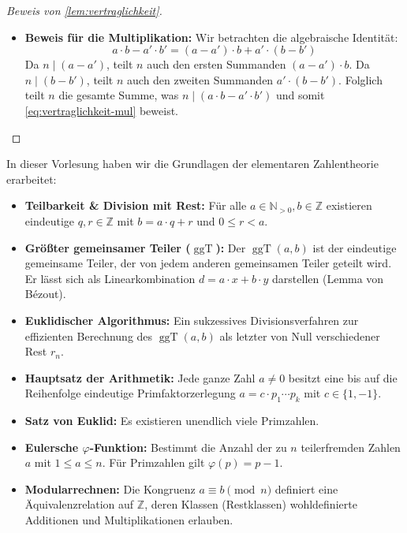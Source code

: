 \begin{proof}[Beweis von \cref{lem:vertraglichkeit}]
\begin{math-stroke}
\begin{itemize}
    \item \textbf{Beweis für die Multiplikation:}
    Wir betrachten die algebraische Identität:
    \[ a \cdot b - a' \cdot b' = (a - a') \cdot b + a' \cdot (b - b') \]
    Da $n \mid (a - a')$, teilt $n$ auch den ersten Summanden $(a - a') \cdot b$.
    Da $n \mid (b - b')$, teilt $n$ auch den zweiten Summanden $a' \cdot (b - b')$.
    Folglich teilt $n$ die gesamte Summe, was $n \mid (a \cdot b - a' \cdot b')$ und somit \eqref{eq:vertraglichkeit-mul} beweist.
\end{itemize}
\end{math-stroke}
\end{proof}

\begin{nice-box}
In dieser Vorlesung haben wir die Grundlagen der elementaren Zahlentheorie erarbeitet:
\begin{itemize}
    \item \textbf{Teilbarkeit \& Division mit Rest:} Für alle $a \in \mathbb{N}_{>0}, b \in \mathbb{Z}$ existieren eindeutige $q, r \in \mathbb{Z}$ mit $b = a \cdot q + r$ und $0 \le r < a$.
    \item \textbf{Größter gemeinsamer Teiler ($\operatorname{ggT}$):} Der $\operatorname{ggT}(a, b)$ ist der eindeutige gemeinsame Teiler, der von jedem anderen gemeinsamen Teiler geteilt wird. Er lässt sich als Linearkombination $d = a \cdot x + b \cdot y$ darstellen (Lemma von Bézout).
    \item \textbf{Euklidischer Algorithmus:} Ein sukzessives Divisionsverfahren zur effizienten Berechnung des $\operatorname{ggT}(a, b)$ als letzter von Null verschiedener Rest $r_n$.
    \item \textbf{Hauptsatz der Arithmetik:} Jede ganze Zahl $a \neq 0$ besitzt eine bis auf die Reihenfolge eindeutige Primfaktorzerlegung $a = c \cdot p_1 \cdots p_k$ mit $c \in \{1, -1\}$.
    \item \textbf{Satz von Euklid:} Es existieren unendlich viele Primzahlen.
    \item \textbf{Eulersche $\varphi$-Funktion:} Bestimmt die Anzahl der zu $n$ teilerfremden Zahlen $a$ mit $1 \le a \le n$. Für Primzahlen gilt $\varphi(p) = p - 1$.
    \item \textbf{Modularrechnen:} Die Kongruenz $a \equiv b \pmod n$ definiert eine Äquivalenzrelation auf $\mathbb{Z}$, deren Klassen (Restklassen) wohldefinierte Additionen und Multiplikationen erlauben.
\end{itemize}
\end{nice-box}

